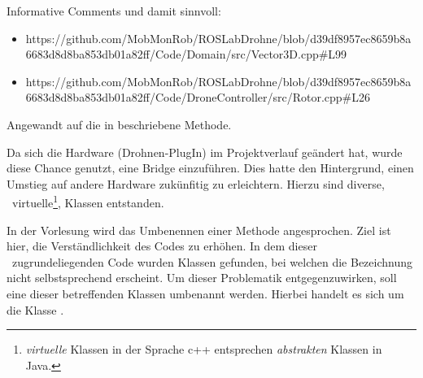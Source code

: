 Informative Comments und damit sinnvoll:
\begin{itemize}
\item https://github.com/MobMonRob/ROSLabDrohne/blob/d39df8957ec8659b8a6683d8d8ba853db01a82ff/Code/Domain/src/Vector3D.cpp\#L99
\item https://github.com/MobMonRob/ROSLabDrohne/blob/d39df8957ec8659b8a6683d8d8ba853db01a82ff/Code/DroneController/src/Rotor.cpp\#L26




\end{itemize}







Angewandt auf die in  beschriebene Methode.




Da sich die Hardware (Drohnen-PlugIn) im Projektverlauf geändert hat, wurde diese Chance genutzt, eine Bridge einzuführen. Dies hatte den Hintergrund, einen Umstieg auf andere Hardware zukünfitig zu erleichtern.
Hierzu sind diverse, \tw\ virtuelle\footnote{\textit{virtuelle} Klassen in der Sprache c++ entsprechen \textit{abstrakten} Klassen in Java.}, Klassen entstanden.










In der Vorlesung wird das Umbenennen einer Methode angesprochen. Ziel ist hier, die Verständlichkeit des Codes zu erhöhen.
In dem dieser \Arbeit\ zugrundeliegenden Code wurden Klassen gefunden, bei welchen die Bezeichnung nicht selbstsprechend erscheint. Um dieser Problematik entgegenzuwirken, soll eine dieser betreffenden Klassen umbenannt werden. Hierbei handelt es sich um die Klasse .
\Commit{}


















